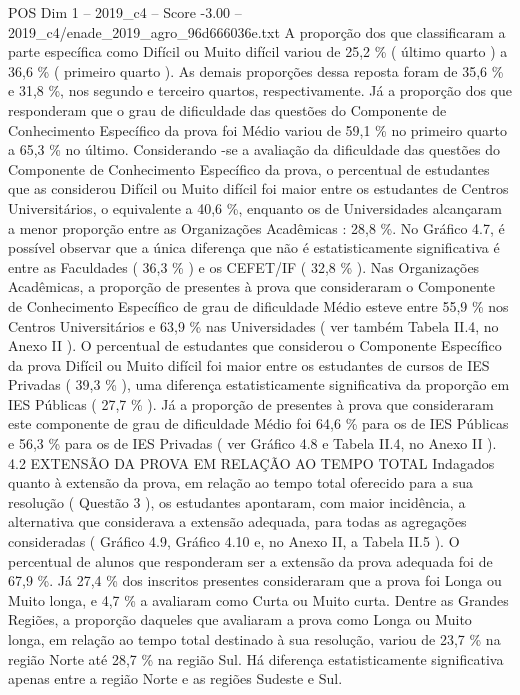 \begin{textsample}{POS Dim 1 – 2019\_c4 – Score -3.00 – 2019\_c4/enade\_2019\_agro\_96d666036e.txt}
A proporção dos que classificaram a parte específica como Difícil ou Muito difícil variou de 25,2 \% ( último quarto ) a 36,6 \% ( primeiro quarto ).
As demais proporções dessa reposta foram de 35,6 \% e 31,8 \%, nos segundo e terceiro quartos, respectivamente.
Já a proporção dos que responderam que o grau de dificuldade das questões do Componente de Conhecimento Específico da prova foi Médio variou de 59,1 \% no primeiro quarto a 65,3 \% no último.
Considerando -se a avaliação da dificuldade das questões do Componente de Conhecimento Específico da prova, o percentual de estudantes que as considerou Difícil ou Muito difícil foi maior entre os estudantes de Centros Universitários, o equivalente a 40,6 \%, enquanto os de Universidades alcançaram a menor proporção entre as Organizações Acadêmicas : 28,8 \%.
No Gráfico 4.7, é possível observar que a única diferença que não é estatisticamente significativa é entre as Faculdades ( 36,3 \% ) e os CEFET/IF ( 32,8 \% ).
Nas Organizações Acadêmicas, a proporção de presentes à prova que consideraram o Componente de Conhecimento Específico de grau de dificuldade Médio esteve entre 55,9 \% nos Centros Universitários e 63,9 \% nas Universidades ( ver também Tabela II.4, no Anexo II ).
O percentual de estudantes que considerou o Componente Específico da prova Difícil ou Muito difícil foi maior entre os estudantes de cursos de IES Privadas ( 39,3 \% ), uma diferença estatisticamente significativa da proporção em IES Públicas ( 27,7 \% ).
Já a proporção de presentes à prova que consideraram este componente de grau de dificuldade Médio foi 64,6 \% para os de IES Públicas e 56,3 \% para os de IES Privadas ( ver Gráfico 4.8 e Tabela II.4, no Anexo II ). 4.2 EXTENSÃO DA PROVA EM RELAÇÃO AO TEMPO TOTAL Indagados quanto à extensão da prova, em relação ao tempo total oferecido para a sua resolução ( Questão 3 ), os estudantes apontaram, com maior incidência, a alternativa que considerava a extensão adequada, para todas as agregações consideradas ( Gráfico 4.9, Gráfico 4.10 e, no Anexo II, a Tabela II.5 ).
O percentual de alunos que responderam ser a extensão da prova adequada foi de 67,9 \%.
Já 27,4 \% dos inscritos presentes consideraram que a prova foi Longa ou Muito longa, e 4,7 \% a avaliaram como Curta ou Muito curta.
Dentre as Grandes Regiões, a proporção daqueles que avaliaram a prova como Longa ou Muito longa, em relação ao tempo total destinado à sua resolução, variou de 23,7 \% na região Norte até 28,7 \% na região Sul.
Há diferença estatisticamente significativa apenas entre a região Norte e as regiões Sudeste e Sul.

\end{textsample}
